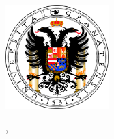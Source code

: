 \begin{titlepage}
    \begin{addmargin}[-1cm]{-3cm}
    \begin{center}
        \large

        \hfill

        \vfill 

        \begingroup
            {\color{Maroon}}
            \bigskip
        	
            {\color{Maroon}\spacedallcaps{\myTitle}}

			\small\mySubtitle \medskip  \medskip
            \\ \bigskip
        \endgroup

        \spacedlowsmallcaps{\myName}

        \vfill



		\includegraphics[width=4cm]{gfx/logo_ugr}
	

        \vfill

        \myProf, \myOtherProf \\
        \myUni \\ \bigskip

        \myTime\ %


    \end{center}
  \end{addmargin}
\end{titlepage}
